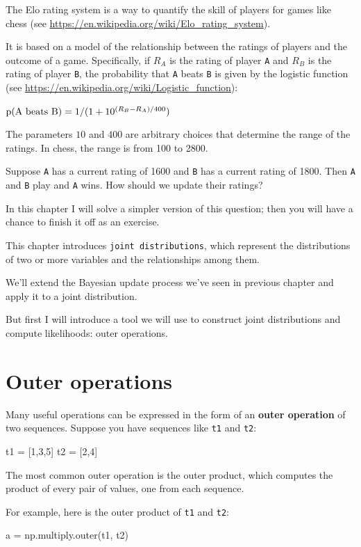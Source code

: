 \documentclass[12pt]{book}
\theoremstyle{exercise}
\newcommand{\py}[1]{{\tt #1}}%
\begin{document}
The Elo rating system is a way to quantify the skill of players for games like chess (see \url{https://en.wikipedia.org/wiki/Elo_rating_system}).

It is based on a model of the relationship between the ratings of players and the outcome of a game.
Specifically, if $R_A$ is the rating of player \py{A} and $R_B$ is the rating of player \py{B}, the probability that \py{A} beats \py{B} is given by the logistic function (see \url{https://en.wikipedia.org/wiki/Logistic_function}):

$\mathrm{p}(\mathrm{A~beats~B}) = 1 / (1 + 10^{(R_B-R_A)/400})$

The parameters $10$ and $400$ are arbitrary choices that determine the range of the ratings.  In chess, the range is from 100 to 2800.

Suppose \py{A} has a current rating of 1600 and \py{B} has a current rating of 1800.
Then \py{A} and \py{B} play and \py{A} wins.  How should we update their ratings?

In this chapter I will solve a simpler version of this question; then you will have a chance to finish it off as an exercise.

This chapter introduces {\tt joint distributions}, which represent the distributions of two or more variables and the relationships among them.

We'll extend the Bayesian update process we've seen in previous chapter and apply it to a joint distribution.

But first I will introduce a tool we will use to construct joint distributions and compute likelihoods: outer operations.


\section{Outer operations}
\label{outer-operations}

Many useful operations can be expressed in the form of an {\bf outer operation} of two sequences.
Suppose you have sequences like \py{t1} and \py{t2}:

\begin{code}
t1 = [1,3,5]
t2 = [2,4]
\end{code}

The most common outer operation is the outer product, which computes the product of every pair of values, one from each sequence.

For example, here is the outer product of \py{t1} and \py{t2}:

\begin{code}
a = np.multiply.outer(t1, t2)
\end{code}
\end{document}
